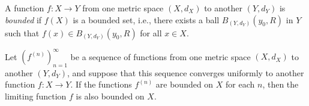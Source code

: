 \begin{definition}\label{3.3.5}
    A function \(f : X \to Y\) from one metric space \((X, d_X)\) to another \((Y, d_Y)\) is \emph{bounded} if \(f(X)\) is a bounded set, i.e., there exists a ball \(B_{(Y, d_Y)}(y_0, R)\) in \(Y\) such that \(f(x) \in B_{(Y, d_Y)}(y_0, R)\) for all \(x \in X\).
\end{definition}

\begin{proposition}\label{3.3.6}
    Let \((f^{(n)})_{n = 1}^\infty\) be a sequence of functions from one metric space \((X, d_X)\) to another \((Y, d_Y)\), and suppose that this sequence converges uniformly to another function \(f : X \to Y\).
    If the functions \(f^{(n)}\) are bounded on \(X\) for each \(n\), then the limiting function \(f\) is also bounded on \(X\).
\end{proposition}

